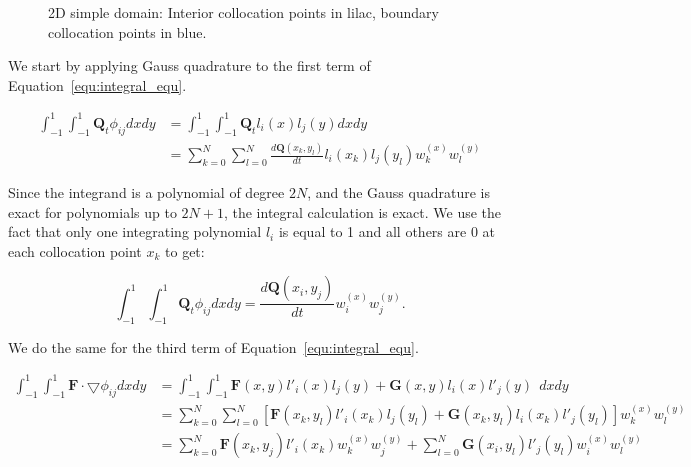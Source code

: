 \begin{figure}[H]
	\centering
	
	\caption{2D simple domain: Interior collocation points in lilac, boundary collocation points in blue.}\label{fig:domain_nodes}
\end{figure}

We start by applying Gauss quadrature to the first term of Equation~\ref{equ:integral_equ}.

\begin{equation}
	\begin{split}
        \int_{-1}^{1}\int_{-1}^{1} \mathbf{Q}_t \phi_{i j} dx dy 
        &= \int_{-1}^{1}\int_{-1}^{1}\mathbf{Q}_t l_i(x) l_j(y) dx dy \\
        &= \sum_{k = 0}^{N} \sum_{l = 0}^{N}\frac{d\mathbf{Q} \left( x_k, y_l \right)}{dt} l_i(x_k) l_j(y_l) w_k^{(x)} w_l^{(y)}
	\end{split}
\end{equation}

Since the integrand is a polynomial of degree \(2 N\), and the Gauss quadrature is exact for
polynomials up to \(2 N + 1\), the integral calculation is exact. We use the fact that only one
integrating polynomial \(l_i\) is equal to 1 and all others are 0 at each collocation point \(x_k\)
to get:

\begin{equation} \label{equ:integral_1}
    \int_{-1}^{1}\int_{-1}^{1} \mathbf{Q}_t \phi_{i j} dx dy 
    = \frac{d\mathbf{Q} \left( x_i, y_j \right)}{dt} w_i^{(x)} w_j^{(y)}.
\end{equation}

We do the same for the third term of Equation~\ref{equ:integral_equ}.

\begin{equation} \label{equ:integral_3}
	\begin{split}
		\int_{-1}^{1}\int_{-1}^{1}\mathbf{F} \cdot \bigtriangledown \phi_{i j} dx dy 
		&= \int_{-1}^{1}\int_{-1}^{1}\mathbf{F}(x, y) l'_i(x)l_j(y) + \mathbf{G}(x, y) l_i(x) l'_j(y) \: \: dx dy \\ 
		&= \sum_{k = 0}^{N} \sum_{l = 0}^{N}\left [ \mathbf{F}(x_k, y_l)l'_i(x_k)l_j(y_l) + \mathbf{G}(x_k, y_l) l_i(x_k)l'_j(y_l) \right ]w_k^{(x)} w_l^{(y)} \\
		&= \sum_{k = 0}^{N} \mathbf{F}(x_k, y_j)l'_i(x_k)w_k^{(x)} w_j^{(y)} + \sum_{l = 0}^{N}\mathbf{G}(x_i, y_l) l'_j(y_l) w_i^{(x)} w_l^{(y)}
	\end{split}
\end{equation}

